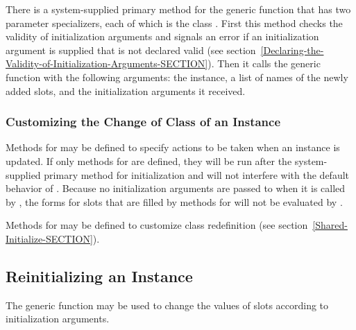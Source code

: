 There is a system-supplied primary method for the generic function
 that has two parameter
specializers, each of which is the class .  First
this method checks the validity of initialization arguments and
signals an error if an initialization argument is supplied that is not
declared valid (see section~\ref{Declaring-the-Validity-of-Initialization-Arguments-SECTION}).
Then it calls the
generic function  with the following arguments:
the instance, a list of names of the newly added slots, and the
initialization arguments it received.


\subsubsection{Customizing the Change of Class of an Instance}

Methods for  may be defined
to specify actions to be taken when an instance is updated.  If only
 methods for  are
defined, they will be run after the system-supplied primary method for
initialization and will not interfere with the default behavior of
.  Because no initialization
arguments are passed to  when
it is called by , the  forms for slots
that are filled by  methods for 
 will not be evaluated by 
.

Methods for  may be defined to customize class
redefinition (see section~\ref{Shared-Initialize-SECTION}).

\subsection{Reinitializing an Instance}
\label{Reinitializing-an-Instance-SECTION}

The generic function  may be used to change
the values of slots according to initialization arguments.

